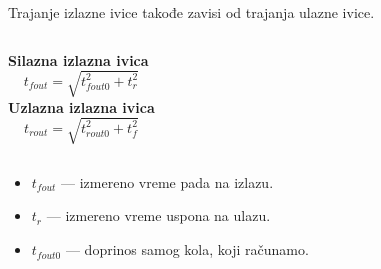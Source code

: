 \begin{frame}[label=08-s039]
Trajanje izlazne ivice takođe zavisi od trajanja ulazne ivice.\par\medskip
\begin{columns}[T,onlytextwidth]
\textbf{Silazna izlazna ivica}
\[t_{fout}=\sqrt{t_{fout0}^{2}+t_r^2}\]
\textbf{Uzlazna izlazna ivica}
\[t_{rout}=\sqrt{t_{rout0}^{2}+t_f^2}\]
\end{columns}\medskip
\begin{itemize}
\item $t_{fout}$ — izmereno vreme pada na izlazu.
\item $t_r$ — izmereno vreme uspona na ulazu.
\item $t_{fout0}$ — doprinos samog kola, koji računamo.
\end{itemize}
\end{frame}
